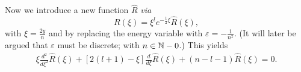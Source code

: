 Now we introduce a new function $\hat{R}$  {\it via}
\begin{equation}
R(  \xi )=  \xi ^l e^{-\frac{1}{2}  \xi }\hat{R}(  \xi ) ,
\label{2011-m-ch-qae4a19s}
\end{equation}
with $  \xi =\frac{2y}{n}$ and by replacing the energy variable with
$\varepsilon =-\frac{1}{n^2}$.
(It will later be argued that $\varepsilon$ must be discrete;  with $n\in {\Bbb N}-0$.)
This yields
\begin{equation}
\begin{split}
\xi  \frac{d^2}{   d    \xi^2}\hat{R}( \xi )  +[ 2 (l+1)-\xi] \frac{   d   }{   d    \xi } \hat{R}( \xi )
+ ( n-l-1  ) \hat{R}( \xi )
 = 0.
\end{split}
\label{2011-m-ch-qae4a191ssAe}
\end{equation}

